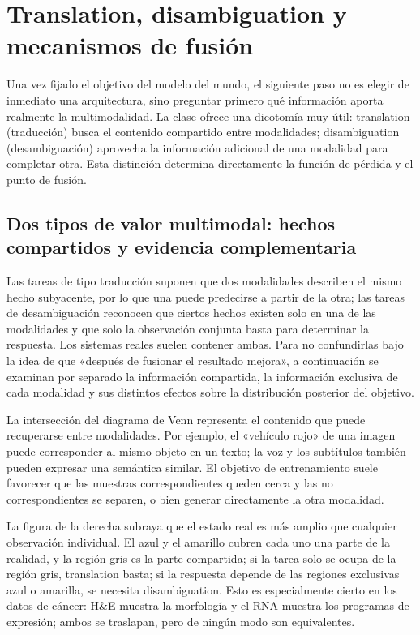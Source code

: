 \section{Translation, disambiguation y mecanismos de fusión}

Una vez fijado el objetivo del modelo del mundo, el siguiente paso no es elegir de inmediato una arquitectura, sino preguntar primero qué información aporta realmente la multimodalidad. La clase ofrece una dicotomía muy útil: translation (traducción) busca el contenido compartido entre modalidades; disambiguation (desambiguación) aprovecha la información adicional de una modalidad para completar otra. Esta distinción determina directamente la función de pérdida y el punto de fusión.

\subsection{Dos tipos de valor multimodal: hechos compartidos y evidencia complementaria}

Las tareas de tipo traducción suponen que dos modalidades describen el mismo hecho subyacente, por lo que una puede predecirse a partir de la otra; las tareas de desambiguación reconocen que ciertos hechos existen solo en una de las modalidades y que solo la observación conjunta basta para determinar la respuesta. Los sistemas reales suelen contener ambas. Para no confundirlas bajo la idea de que «después de fusionar el resultado mejora», a continuación se examinan por separado la información compartida, la información exclusiva de cada modalidad y sus distintos efectos sobre la distribución posterior del objetivo.


La intersección del diagrama de Venn representa el contenido que puede recuperarse entre modalidades. Por ejemplo, el «vehículo rojo» de una imagen puede corresponder al mismo objeto en un texto; la voz y los subtítulos también pueden expresar una semántica similar. El objetivo de entrenamiento suele favorecer que las muestras correspondientes queden cerca y las no correspondientes se separen, o bien generar directamente la otra modalidad.


La figura de la derecha subraya que el estado real es más amplio que cualquier observación individual. El azul y el amarillo cubren cada uno una parte de la realidad, y la región gris es la parte compartida; si la tarea solo se ocupa de la región gris, translation basta; si la respuesta depende de las regiones exclusivas azul o amarilla, se necesita disambiguation. Esto es especialmente cierto en los datos de cáncer: H\&E muestra la morfología y el RNA muestra los programas de expresión; ambos se traslapan, pero de ningún modo son equivalentes.

